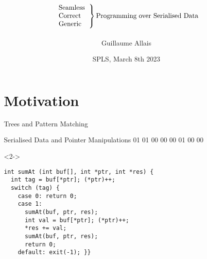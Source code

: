 \documentclass{beamer}
\title{
  \[
  \left.
    \begin{tabular}{l}
      Seamless \\
      Correct \\
      Generic
    \end{tabular}
  \right\}
  \text{Programming over Serialised Data}
  \]}
\author{Guillaume Allais}
\institute{University of St Andrews}
\date{SPLS, March 8th 2023}
\newcommand{\hexadata}[1]{\texttt{\IdrisData{#1}}}
\newenvironment{hexdump}{\medskip\ttfamily\obeyspaces\obeylines\noindent}{\medskip}
\begin{document}
\begin{frame}
  \maketitle
\end{frame}

\section{Motivation}

\newcommand{\mknode}[3]{\draw (#1,#2)  circle (.27cm) node[align=center] {\IdrisData{#3}};}
\newcommand{\mkleaf}[2]{\draw[fill=black] (#1,#2) node[align=center] {} +(-.1cm,-.1cm) rectangle +(.1cm,.1cm);}

\begin{frame}{Trees and Pattern Matching}
\begin{minipage}{.5\textwidth}
\end{minipage}\hfill
\begin{minipage}{.45\textwidth}
\end{minipage}
\end{frame}

\begin{frame}[fragile]{Serialised Data and Pointer Manipulations}
\begin{hexdump}
01 01 01 00 \hexadata{01} 00 \hexadata{05} 00 \hexadata{0a} 01 00 \hexadata{14} 00
\end{hexdump}
\begin{overlayarea}{\linewidth}{6cm}
\begin{onlyenv}<2->
\begin{lstlisting}
int sumAt (int buf[], int *ptr, int *res) {
  int tag = buf[*ptr]; (*ptr)++;
  switch (tag) {
    case 0: return 0;
    case 1:
      sumAt(buf, ptr, res);
      int val = buf[*ptr]; (*ptr)++;
      *res += val;
      sumAt(buf, ptr, res);
      return 0;
    default: exit(-1); }}
\end{lstlisting}
\end{onlyenv}
\end{overlayarea}
\end{frame}
\end{document}
